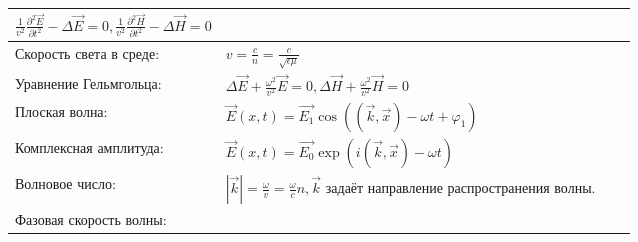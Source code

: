 \documentclass{article}
\begin{document}
\begin{tabular}{ |p{4.1cm}|p{5.4cm}|p{4.1cm}|p{4.4cm}|  }
$\frac{1}{v^2} \frac{\partial^2 \vec{E}}{\partial t^2} - \Delta \vec{E} = 0,
\frac{1}{v^2} \frac{\partial^2 \vec{H}}{\partial t^2} - \Delta \vec{H} = 0$  &  %
                                                                             &  %
                                                                             \\ %
\hline
Скорость света в среде:                                                      &  %
$v = \frac{c}{n} = \frac{c}{\sqrt{\epsilon\mu}}$                             &  %
                                                                             &  %
                                                                             \\ %
\hline
Уравнение Гельмгольца:                                                       &  %
$\Delta \vec{E} + \frac{\omega^2}{v^2} \vec{E} = 0,
\Delta \vec{H} + \frac{\omega^2}{v^2} \vec{H} = 0$                           &  %
                                                                             &  %
                                                                             \\ %
\hline
Плоская волна:                                                               &  %
$\vec{E}(x, t) = \vec{E_1} \cos((\vec{k}, \vec{x}) - \omega t + \varphi_1)$  &  %
                                                                             &  %
                                                                             \\ %
\hline
Комплексная амплитуда:                                                       &  %
$\vec{E}(x, t) = \vec{E_0} \exp(i(\vec{k}, \vec{x}) - \omega t)$             &  %
                                                                             &  %
                                                                             \\ %
\hline
Волновое число:                                                              &  %
$|\vec{k}| = \frac{\omega}{v} = \frac{\omega}{c} n, \vec{k}$ задаёт
 направление распространения волны.                                          &  %
                                                                             &  %
                                                                             \\ %
\hline
Фазовая скорость волны:                                                      &  %

\end{tabular}
\end{document}
